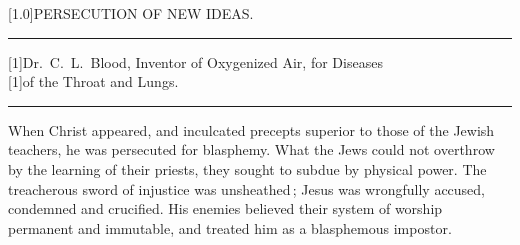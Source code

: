 \documentclass[10pt]{article}
\begin{document}
%
%
\begin{multicols}{3}
\begin{centering}
\Large \scalebox{1.2}[1.0]{PERSECUTION OF NEW IDEAS.}

\vspace{3mm}

\rule[3pt]{2em}{0.7pt}

\vspace{2mm}

\large \scalebox{1.15}[1]{Dr.~C.~L.~Blood, Inventor of Oxygenized Air, for Diseases}\\[2.5mm]
\scalebox{1.15}[1]{of the Throat and Lungs.}

\vspace{3mm}

\rule[3pt]{2em}{0.7pt}

\vspace{2mm}

\end{centering}

\openup 1.09mm
When Christ appeared, and inculcated precepts superior to those of the\linebreak
Jewish teachers, he was persecuted for blasphemy. What the Jews could\linebreak
not overthrow by the learning of their priests, they sought to subdue by\linebreak
physical power. The treacherous sword of injustice was unsheathed\,;\linebreak
Jesus was wrongfully accused, condemned and crucified. His enemies\linebreak
believed their system of worship permanent and immutable, and treated him\linebreak
as a blasphemous impostor.


\end{multicols}
\end{document}
